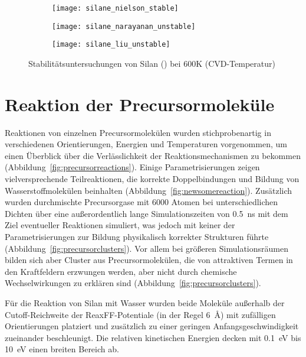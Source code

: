 \begin{figure}[b!h]

  \captionsetup[subfigure]{singlelinecheck=false}
  \def\subfigwidth{0.32\textwidth}
  \begin{subfigure}[t]{3.5cm}
    \texttt{[image: silane\_nielson\_stable]}
  \end{subfigure}
  \hfill
  \begin{subfigure}[t]{4.5cm}
    \texttt{[image: silane\_narayanan\_unstable]}
  \end{subfigure}
  \hfill
  \begin{subfigure}[t]{5cm}
    \texttt{[image: silane\_liu\_unstable]}
  \end{subfigure}

  \caption[Stabilitätsuntersuchungen von Silan]{
    Stabilitätsuntersuchungen von Silan () bei 600K (CVD-Temperatur)
  }
  \label{fig:silanestability}

\end{figure}

\section{Reaktion der Precursormoleküle}

Reaktionen von einzelnen Precursormolekülen wurden stichprobenartig in verschiedenen Orientierungen, Energien und Temperaturen vorgenommen, um einen Überblick über die Verlässlichkeit der Reaktionsmechanismen zu bekommen (Abbildung~\ref{fig:precursorreactions}).
Einige Parametrisierungen zeigen vielversprechende Teilreaktionen, die korrekte Doppelbindungen und Bildung von Wasserstoffmolekülen beinhalten (Abbildung~\ref{fig:newsomereaction}).
Zusätzlich wurden durchmischte Precursorgase mit \num{6000} Atomen bei unterschiedlichen Dichten über eine außerordentlich lange Simulationszeiten von \SI{0.5}{\nano\second} mit dem Ziel eventueller Reaktionen simuliert, was jedoch mit keiner der Parametrisierungen zur Bildung physikalisch korrekter Strukturen führte (Abbildung~\ref{fig:precursorclusters}).
Vor allem bei größeren Simulationsräumen bilden sich aber Cluster aus Precursormolekülen, die von attraktiven Termen in den Kraftfeldern erzwungen werden, aber nicht durch chemische Wechselwirkungen zu erklären sind (Abbildung~\ref{fig:precursorclusters}).

Für die Reaktion von Silan mit Wasser wurden beide Moleküle außerhalb der Cutoff-Reich\-weite der ReaxFF-Potentiale (in der Regel \SI{6}{\angstrom}) mit zufälligen Orientierungen platziert und zusätzlich zu einer geringen Anfangsgeschwindigkeit zueinander beschleunigt.
Die relativen kinetischen Energien decken mit \SI{0.1}{\electronvolt} bis \SI{10}{\electronvolt}  einen breiten Bereich ab.

